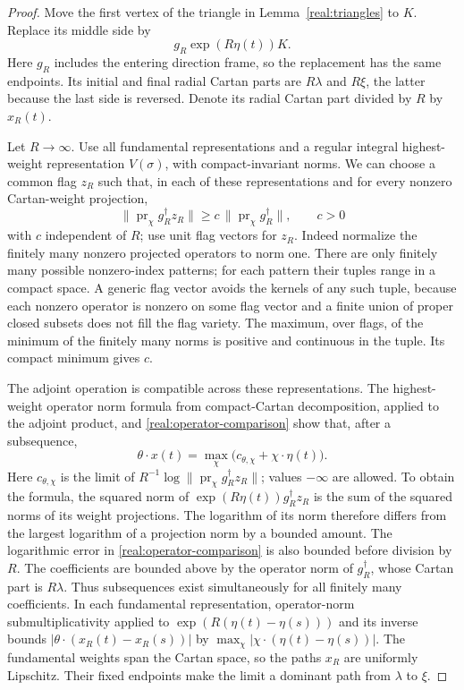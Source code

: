 \begin{proof}
Move the first vertex of the triangle in Lemma~\ref{real:triangles}
to $K$.  Replace its middle side by
\[
 g_R\exp(R\eta(t))K.
\]
Here $g_R$ includes the entering direction frame, so the replacement
has the same endpoints.  Its initial and final radial Cartan parts
are $R\lambda$ and $R\xi$, the latter because the last side is
reversed.  Denote its radial Cartan part divided by $R$ by $x_R(t)$.

Let $R\to\infty$.  Use all fundamental representations and a regular integral
highest-weight representation $V(\sigma)$, with compact-invariant
norms.  We can choose a common flag $z_R$ such that, in each of these
representations and for every nonzero Cartan-weight projection,
\begin{equation}\label{real:operator-comparison}
 \|\operatorname{pr}_\chi g_R^\dagger z_R\|
 \ge c\,\|\operatorname{pr}_\chi g_R^\dagger\|,
 \qquad c>0
\end{equation}
with $c$ independent of $R$; use unit flag vectors for $z_R$.
Indeed normalize the finitely many nonzero projected operators to
norm one.  There are only finitely many possible nonzero-index patterns;
for each pattern their tuples range in a compact space.  A generic flag
vector avoids the kernels of any such tuple, because each nonzero
operator is nonzero on some flag vector and a finite union of proper
closed subsets does not fill the flag variety.  The maximum, over
flags, of the minimum of the finitely many norms is positive and
continuous in the tuple.  Its compact minimum gives $c$.

The adjoint operation is compatible across these representations.
The highest-weight operator norm formula from compact-Cartan
decomposition, applied to the adjoint product, and
\eqref{real:operator-comparison} show that, after a subsequence,
\begin{equation}\label{real:tropical}
 \theta\cdot x(t)
 =\max_\chi\bigl(c_{\theta,\chi}+\chi\cdot\eta(t)\bigr).
\end{equation}
Here $c_{\theta,\chi}$ is the limit of
$R^{-1}\log\|\operatorname{pr}_\chi g_R^\dagger z_R\|$;
values $-\infty$ are allowed.  To obtain the formula, the squared norm of
$\exp(R\eta(t))g_R^\dagger z_R$ is the sum of the squared norms
of its weight projections.  The logarithm of its norm therefore
differs from the largest logarithm of a projection norm by a bounded
amount.  The logarithmic error in
\eqref{real:operator-comparison} is also bounded before division by
$R$.  The coefficients are bounded above by the operator norm of
$g_R^\dagger$, whose Cartan part is $R\lambda$.  Thus subsequences
exist simultaneously for all finitely many coefficients.  In each
fundamental representation, operator-norm submultiplicativity applied
to $\exp(R(\eta(t)-\eta(s)))$ and its inverse bounds
$|\theta\cdot(x_R(t)-x_R(s))|$ by
$\max_\chi |\chi\cdot(\eta(t)-\eta(s))|$.  The fundamental
weights span the Cartan space, so the paths $x_R$ are
uniformly Lipschitz.  Their fixed endpoints make the limit a dominant
path from $\lambda$ to $\xi$.


\end{proof}
